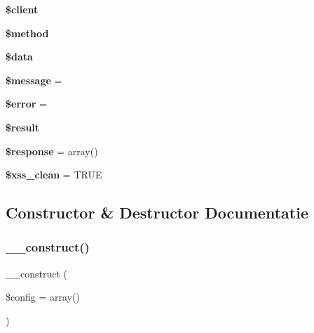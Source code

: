 \begin{DoxyCompactItemize}
{\bfseries \$client}
\item 
\mbox{\label{class_c_i___xmlrpc_a12661b2fc0f57f97e30a1620889ce9c6}} 
{\bfseries \$method}
\item 
\mbox{\label{class_c_i___xmlrpc_a6efc15b5a2314dd4b5aaa556a375c6d6}} 
{\bfseries \$data}
\item 
\mbox{\label{class_c_i___xmlrpc_abf17cb2dba2ed17cb28aa5f37deb5293}} 
{\bfseries \$message} = \textquotesingle{}\textquotesingle{}
\item 
\mbox{\label{class_c_i___xmlrpc_aeba2ab722cedda53dbb7ec1a59f45550}} 
{\bfseries \$error} = \textquotesingle{}\textquotesingle{}
\item 
\mbox{\label{class_c_i___xmlrpc_a112ef069ddc0454086e3d1e6d8d55d07}} 
{\bfseries \$result}
\item 
\mbox{\label{class_c_i___xmlrpc_af4b6fb1bbc77ccc05f10da3b16935b99}} 
{\bfseries \$response} = array()
\item 
\mbox{\label{class_c_i___xmlrpc_a0f2ee8861c0b3164a5c6e126dd98c0cc}} 
{\bfseries \$xss\+\_\+clean} = T\+R\+UE
\end{DoxyCompactItemize}


\subsection{Constructor \& Destructor Documentatie}
\mbox{\label{class_c_i___xmlrpc_af7f9493844d2d66e924e3c1df51ce616}} 
\subsubsection{\texorpdfstring{\_\_construct()}{\_\_construct()}}
{\footnotesize\ttfamily \+\_\+\+\_\+construct (\begin{DoxyParamCaption}\item[{}]{\$config = {\ttfamily array()} }\end{DoxyParamCaption})}

